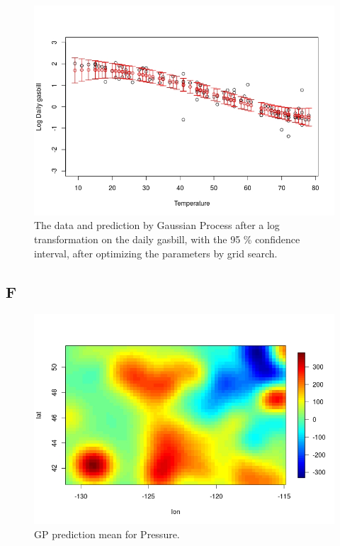 \documentclass{article}
\begin{document}
\begin{figure}
\includegraphics[width=\textwidth]{util_gp_grid.jpeg}
\caption{The data and prediction by Gaussian Process after a log transformation on the daily gasbill, with the 95 \% confidence interval, after optimizing the parameters by grid search.}
\label{fig:util_log2}
\end{figure}

\subsection*{F}
\begin{figure}
\includegraphics[width=\textwidth]{weather.jpeg}
\caption{GP prediction mean for Pressure.}
\label{fig:we}
\end{figure}
\end{document}
